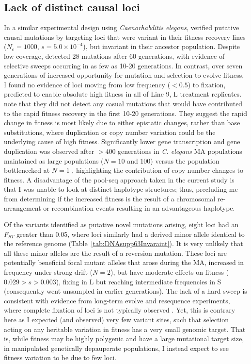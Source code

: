 \subsection{Lack of distinct causal loci}
In a similar experimental design using \textit{Caenorhabditis elegans}, \citet{Denv10} verified putative causal mutations by targeting loci that were variant in their fitness recovery lines ($N_e = 1000$, $s = 5.0 \times 10^{-4}$), but invariant in their ancestor population. Despite low coverage, \citet{Denv10} detected 28 mutations after 60 generations, with evidence of selective sweeps occurring in as few as 10-20 generations. In contrast, over seven generations of increased opportunity for mutation and selection to evolve fitness, I found no evidence of loci moving from low frequency ($<0.5$) to fixation, predicted to enable absolute high fitness in all of Line 9, L treatment replicates. \citet{Denv10} note that they did not detect any casual mutations that would have contributed to the rapid fitness recovery in the first 10-20 generations. They suggest the rapid change in fitness is most likely due to either epistatic changes, rather than base substitutions, where duplication or copy number variation could be the underlying cause of high fitness. Significantly lower gene transcription and gene duplication was observed after $>400$ generations in \textit{C. elegans} MA populations maintained as large populations ($N = 10$ and 100) versus the population bottlenecked at $N = 1$ \citep{Konr18}, highlighting the contribution of copy number changes to fitness. A disadvantage of the pool-seq approach taken in the current study is that I was unable to look at distinct haplotype structures; thus, precluding me from determining if the increased fitness is the result of a chromosomal re-arrangement or recombination events resulting in an advantageous haplotype. \par

Of the variants identified as putative novel mutations arising, eight loci had an $F_{ST}$ greater than 0.05, where loci similarly had a derived minor allele identical to the reference genome (Table~\ref{tab:DNAsupp63Invaraint}). It is very unlikely that all these minor alleles are the result of a reversion mutation. These loci are potentially beneficial focal mutant alleles that arose during the MA, increased in frequency under strong drift ($N=2$), but have moderate effects on fitness ($0.029 > s > 0.003$), fixing in L but reaching intermediate frequencies in S (consequently went unsampled in earlier generations). The lack of a hard sweep is consistent with evidence from long-term evolve and resequence experiments, where complete fixation of loci is not typically observed \citep{Burk12}. Yet, this is contrary here as I expected (and observed) very few variant sites, such that selection acting on any heritable variation in fitness has a very small genomic target. That is, while fitness may be highly polygenic and have a large mutational target size, in manipulated genetically depauperate populations, I instead expect to see fitness variation to be due to few loci. \par

